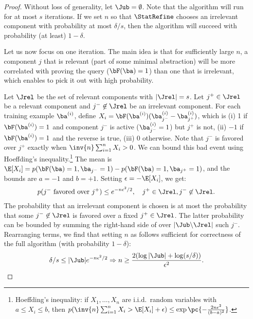 \begin{proof}
Without loss of generality, let $\Jub = \emptyset$.
Note that the algorithm will run for at most $s$ iterations.
If we set $n$ so that $\StatRefine$ chooses an irrelevant component with probability at most $\delta/s$,
then the algorithm will succeed with probability (at least) $1-\delta$.

Let us now focus on one iteration.
The main idea is that for sufficiently large $n$, 
a component $j$ that is relevant (part of some minimal abstraction)
will be more correlated with proving the query ($\bF(\ba) = 1$) than one that is irrelevant,
which enables to pick it out with high probability.

Let $\Jrel$ be the set of relevant components with $|\Jrel| = s$.
Let $j^+ \in \Jrel$ be a relevant component and $j^- \not\in \Jrel$ be an irrelevant component.
For each training example $\ba^{(i)}$, define
$X_i = \bF(\ba^{(i)}) (\ba^{(i)}_{j^-} - \ba^{(i)}_{j^+})$,
which is (i) 1 if $\bF(\ba^{(i)}) = 1$ and component $j^-$ is active ($\ba^{(i)}_{j^-} = 1$)
but $j^+$ is not,
(ii) $-1$ if $\bF(\ba^{(i)}) = 1$ and the reverse is true,
(iii) 0 otherwise.
Note that $j^-$ is favored over $j^+$ exactly when $\inv{n} \sum_{i=1}^n X_i > 0$.
We can bound this bad event using Hoeffding's inequality.\footnote{Hoeffding's inequality: if $X_1, \dots, X_n$ are i.i.d.~random variables 
with $a \le X_i \le b$, then
$p(\inv{n} \sum_{i=1}^n X_i > \E[X_i]+\epsilon) \le \exp\pc{-\frac{2 n \epsilon^2}{(b-a)^2}}$.}
The mean is $\E[X_i] = p(\bF(\ba)=1, \ba_{j^-}=1) - p(\bF(\ba)=1, \ba_{j^+}=1)$,
and the bounds are $a = -1$ and $b = +1$.
Setting $\epsilon = -\E[X_i]$, we get:
\begin{align}
\label{eqn:joverj}
p(j^- \text{ favored over } j^+) \le e^{-n\epsilon^2/2}, \quad j^+ \in \Jrel, j^- \not\in \Jrel.
\end{align}
The probability that an irrelevant component is chosen is at most
the probability that some $j^- \not\in\Jrel$ is favored over a fixed $j^+ \in \Jrel$.
The latter probability
can be bounded by summing the right-hand side of  over $|\Jub \backslash \Jrel|$ such $j^-$.
Rearranging terms, we find that setting $n$ as follows sufficient for
correctness of the full algorithm (with probability $1-\delta$):
\begin{align}
\label{eqn:delta}
\delta/s \le |\Jub| e^{-n\epsilon^2/2}
\Rightarrow n \ge \frac{2(\log |\Jub| + \log (s/\delta))}{\epsilon^2}.
\end{align}


\end{proof}
